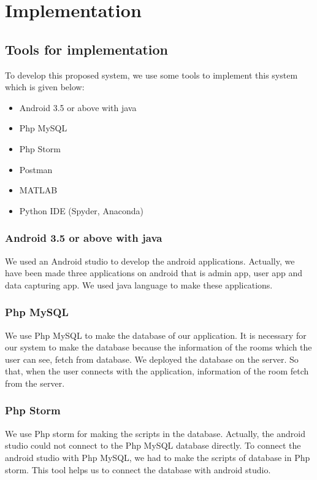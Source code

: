 

\chapter{Implementation} %
\label{Chapter 5}

\section{Tools for implementation}
To develop this proposed system, we use some tools to implement this system which is given below:
\begin{itemize}
\item Android 3.5 or above with java
\item Php MySQL
\item Php Storm
\item Postman
\item MATLAB
\item Python IDE (Spyder, Anaconda)
\end{itemize}


\subsection{Android 3.5 or above with java}
We used an Android studio to develop the android applications. Actually, we have been made three applications on android that is admin app, user app and data capturing app. We used java language to make these applications.

\subsection{Php MySQL}
We use Php MySQL to make the database of our application. It is necessary for our system to make the database because the information of the rooms which the user can see, fetch from database. We deployed the database on the server. So that, when the user connects with the application, information of the room fetch from the server.

\subsection{Php Storm}
We use Php storm for making the scripts in the database. Actually, the android studio could not connect to the Php MySQL database directly. To connect the android studio with Php MySQL, we had to make the scripts of database in Php storm. This tool helps us to connect the database with android studio.

